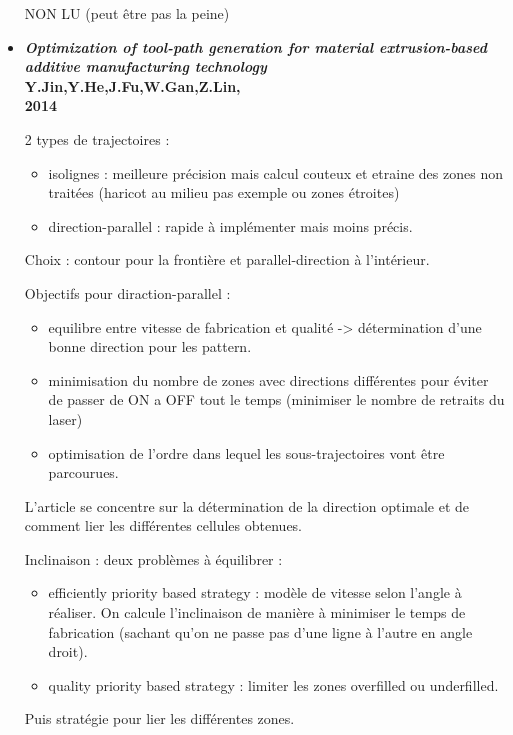 \documentclass[11pt,a4paper]{article}
\begin{document}
\begin{itemize}
	NON LU (peut être pas la peine)
	
	\item \textbf{\emph{Optimization of tool-path generation for material extrusion-based additive manufacturing technology} \\
		Y.Jin,Y.He,J.Fu,W.Gan,Z.Lin, \\
		2014}
	
	\vspace{0cm}
	
	2 types de trajectoires : 
	\begin{itemize}
		\item isolignes : meilleure précision mais calcul couteux et etraine des zones non traitées (haricot au milieu pas exemple ou zones étroites)
		\item direction-parallel : rapide à implémenter mais moins précis.
	\end{itemize}
	Choix : contour pour la frontière et parallel-direction à l'intérieur.
	
	Objectifs pour diraction-parallel : 
	\begin{itemize}
		\item equilibre entre vitesse de fabrication et qualité -> détermination d'une bonne direction pour les pattern.
		\item minimisation du nombre de zones avec directions différentes pour éviter de passer de ON a OFF tout le temps (minimiser le nombre de retraits du laser)
		\item optimisation de l'ordre dans lequel les sous-trajectoires vont être parcourues.
	\end{itemize}
	
	L'article se concentre sur la détermination de la direction optimale et de comment lier les différentes cellules obtenues.
	
	\vspace{0cm}
	
	Inclinaison : deux problèmes à équilibrer :
	\begin{itemize}
		\item efficiently priority based strategy : modèle de vitesse selon l'angle à réaliser. On calcule l'inclinaison de manière à minimiser le temps de fabrication (sachant qu'on ne passe pas d'une ligne à l'autre en angle droit).
		
		\item quality priority based strategy : limiter les zones overfilled ou underfilled.
	\end{itemize}
	
	Puis stratégie pour lier les différentes zones.
\end{itemize}		
\end{document}

